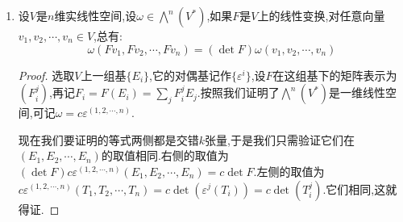 \begin{enumerate}
\begin{proof}
		验证$S$是线性无关的:如果有$\sum_I\alpha_I\varepsilon^I=0$,其中$I$取遍不同的递增重指标,任取递增的重指标$J=(j_1,\cdots,j_k)$,把这个等式作用在$(E_{j_1},\cdots,E_{j_k})$上得到$\alpha_J=0$,这说明线性无关性.
	\end{proof}
    \item 设$V$是$n$维实线性空间,设$\omega\in\bigwedge^n(V^*)$,如果$F$是$V$上的线性变换,对任意向量$v_1,v_2,\cdots,v_n\in V$,总有:
    $$\omega(Fv_1,Fv_2,\cdots,Fv_n)=(\det F)\omega(v_1,v_2,\cdots,v_n)$$
    \begin{proof}
    	
    	选取$V$上一组基$\{E_i\}$,它的对偶基记作$\{\varepsilon^i\}$,设$F$在这组基下的矩阵表示为$(F_i^j)$,再记$F_i=F(E_i)=\sum_jF_i^jE_j$.按照我们证明了$\bigwedge^n(V^*)$是一维线性空间,可记$\omega=c\varepsilon^{(1,2,\cdots,n)}$.
    	
    	现在我们要证明的等式两侧都是交错$k$张量,于是我们只需验证它们在$(E_1,E_2,\cdots,E_n)$的取值相同.右侧的取值为$(\det F)c\varepsilon^{(1,2,\cdots,n)}(E_1,E_2,\cdots,E_n)=c\det F$.左侧的取值为$c\varepsilon^{(1,2,\cdots,n)}(T_1,T_2,\cdots,T_n)=c\det(\varepsilon^j(T_i))=c\det(T_i^j)$.它们相同,这就得证.
    \end{proof}
\end{enumerate}


